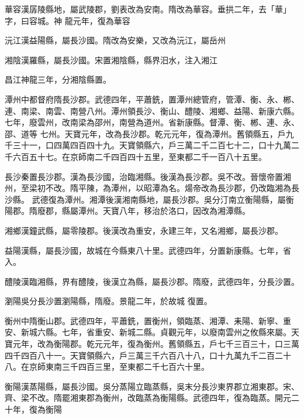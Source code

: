 \begin{pinyinscope}
 華容漢孱陵縣地，屬武陵郡，劉表改為安南。隋改為華容。垂拱二年，去「華」字，曰容城。神
 龍元年，復為華容



 沅江漢益陽縣，屬長沙國。隋改為安樂，又改為沅江，屬岳州



 湘陰漢羅縣，屬長沙國。宋置湘陰縣，縣界汨水，注入湘江



 昌江神龍三年，分湘陰縣置。



 潭州中都督府隋長沙郡。武德四年，平蕭銑，置潭州總管府，管潭、衡、永、郴、連、南梁、南雲、南營八州。潭州領長沙、衡山、醴陵、湘鄉、益陽、新康六縣。七年，廢雲州，改南梁為邵州，南營為道州。省新康縣。督潭、衡、郴、連、永、邵、道等
 七州。天寶元年，改為長沙郡。乾元元年，復為潭州。舊領縣五，戶九千三十一，口四萬四百四十九。天寶領縣六，戶三萬二千二百七十二，口十九萬二千六百五十七。在京師南二千四百四十五里，至東都二千一百八十五里。



 長沙秦置長沙郡。漢為長沙國，治臨湘縣。後漢為長沙郡。吳不改。晉懷帝置湘州，至梁初不改。隋平陳，為潭州，以昭潭為名。煬帝改為長沙郡，仍改臨湘為長沙縣。
 武德復為潭州。湘潭後漢湘南縣地，屬長沙郡。吳分汀南立衡陽縣，屬衡陽郡。隋廢郡，縣屬潭州。天寶八年，移治於洛口，因改為湘潭縣。



 湘鄉漢鐘武縣，屬零陵郡。後漢改為重安，永建三年，又名湘鄉，屬長沙郡。



 益陽漢縣，屬長沙國，故城在今縣東八十里。武德四年，分置新康縣。七年，省入。



 醴陵漢臨湘縣，界有醴陵，後漢立為縣，屬長沙郡。隋廢，武德四年，分長沙置。



 瀏陽吳分長沙置瀏陽縣，隋廢。景龍二年，於故城
 復置。



 衡州中隋衡山郡。武德四年，平蕭銑，置衡州，領臨蒸、湘潭、耒陽、新寧、重安、新城六縣。七年，省重安、新城二縣。貞觀元年，以廢南雲州之攸縣來屬。天寶元年，改為衡陽郡。乾元元年，復為衡州。舊領縣五，戶七千三百三十，口三萬四千四百八十一。天寶領縣六，戶三萬三千六百八十八，口十九萬九千二百二十八。在京師東南三千四百三里，至東都二千七百六十里。



 衡陽漢蒸陽縣，屬長沙國。吳分蒸陽立臨蒸縣，吳末分長沙東界郡立湘東郡。宋、齊、梁不改。隋罷湘東郡為衡州，改臨蒸為衡陽縣。武德四年，復為臨蒸。開元二十年，復為衡陽




\end{pinyinscope}

